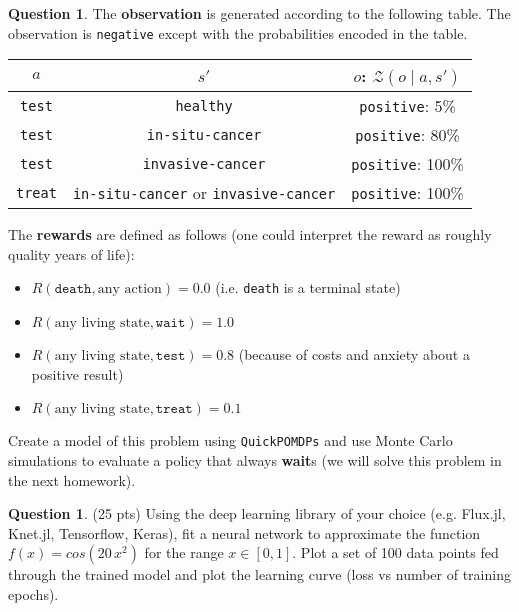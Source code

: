 \documentclass{article}
\theoremstyle{definition}
\newtheorem{question}[thm]{Question}
\newcommand{\ttt}[1]{\texttt{#1}}
\begin{document}
\begin{question}
The \textbf{observation} is generated according to the following table. The observation is \ttt{negative} except with the probabilities encoded in the table.
\begin{center}
    \begin{tabular}{ccc}
    \toprule
    $a$ & $s'$ & $o$: $\mathcal{Z}(o \mid a, s')$ \\
    \midrule
    \texttt{test} & \texttt{healthy} & \texttt{positive}: 5\% \\
    \texttt{test} & \texttt{in-situ-cancer} & \texttt{positive}: 80\% \\
    \texttt{test} & \texttt{invasive-cancer} & \texttt{positive}: 100\% \\
    \texttt{treat} & \ttt{in-situ-cancer} or \texttt{invasive-cancer} & \texttt{positive}: 100\% \\
    \bottomrule
    \end{tabular}
\end{center}

The \textbf{rewards} are defined as follows (one could interpret the reward as roughly quality years of life):
\begin{itemize}[noitemsep]
    \item $R(\texttt{death}, \text{any action}) = 0.0$ (i.e. \texttt{death} is a terminal state)
    \item $R(\text{any living state}, \texttt{wait}) = 1.0$
    \item $R(\text{any living state}, \texttt{test}) = 0.8$ (because of costs and anxiety about a positive result)
    \item $R(\text{any living state}, \texttt{treat}) = 0.1$
\end{itemize}

Create a model of this problem using \texttt{QuickPOMDPs} and use Monte Carlo simulations to evaluate a policy that always \textbf{wait}s (we will solve this problem in the next homework).

\end{question}

\begin{question}
    (25 pts) Using the deep learning library of your choice (e.g. Flux.jl, Knet.jl, Tensorflow, Keras), fit a neural network to approximate the function $f(x) = cos(20\,x^2)$ for the range $x \in [0,1]$. Plot a set of 100 data points fed through the trained model and plot the learning curve (loss vs number of training epochs).
\end{question}
\end{document}
